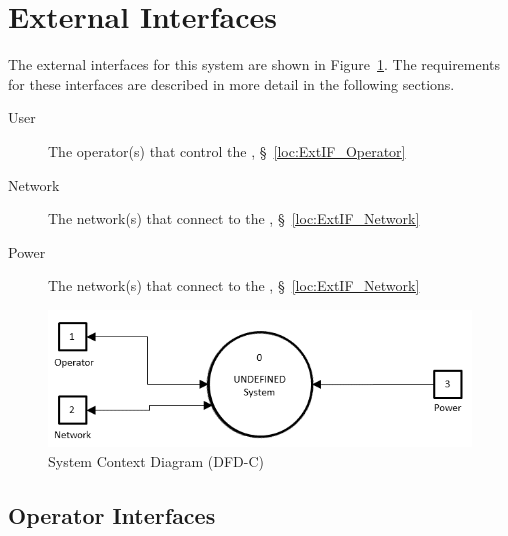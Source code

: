 \newpage
\section{External Interfaces}
\label{loc:ExternalInterfaces}
% 

The external interfaces for this system are shown in Figure~\ref{fig:DFD-C}.
The requirements for these interfaces are described in more detail in the following sections.
\begin{description}
	\item[User] The operator(s) that control the \ThisSys, \S~\ref{loc:ExtIF_Operator}
	\item[Network] The network(s) that connect to the \ThisSys, \S~\ref{loc:ExtIF_Network}
	\item[Power] The network(s) that connect to the \ThisSys, \S~\ref{loc:ExtIF_Network}
\end{description}
\begin{figure}[htbp]
	\centering
		\includegraphics[width=6.5in]{../zProjectWideData/images/DFD-C.png}
	\caption[System Context Diagram]{System Context Diagram (DFD-C)}
	\label{fig:DFD-C}
\end{figure}

\KNEADSUBSECTIONNEWPAGE
\subsection{Operator Interfaces}
\label{loc:ExtIF_Operator}




\KNEADSUBSECTIONNEWPAGE

